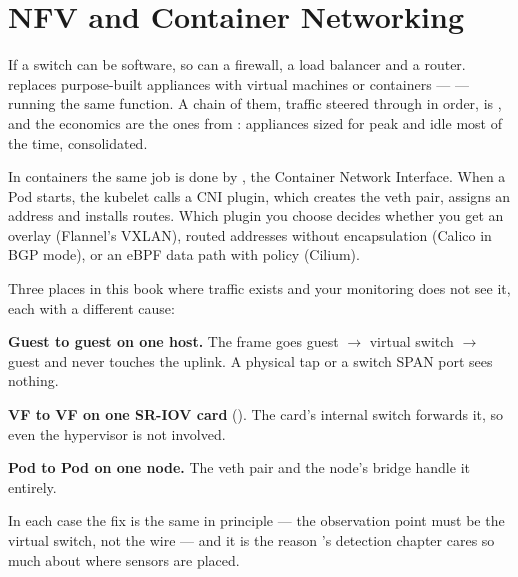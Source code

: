 \section{NFV and Container Networking}

If a switch can be software, so can a firewall, a load balancer and a router.
 replaces purpose-built appliances with
virtual machines or containers ---  --- running the same function.
A chain of them, traffic steered through in order, is ,
and the economics are the ones from : appliances sized for peak and
idle most of the time, consolidated.

In containers the same job is done by , the Container Network
Interface. When a Pod starts, the kubelet calls a CNI plugin, which creates the
veth pair, assigns an address and installs routes. Which plugin you choose
decides whether you get an overlay (Flannel's VXLAN), routed addresses without
encapsulation (Calico in BGP mode), or an eBPF data path with policy (Cilium).

\begin{alertbox}
Three places in this book where traffic exists and your monitoring does not see
it, each with a different cause:

\smallskip
\textbf{Guest to guest on one host.} The frame goes guest $\rightarrow$ virtual
switch $\rightarrow$ guest and never touches the uplink. A physical tap or a
switch SPAN port sees nothing.

\smallskip
\textbf{VF to VF on one SR-IOV card} (). The card's internal
switch forwards it, so even the hypervisor is not involved.

\smallskip
\textbf{Pod to Pod on one node.} The veth pair and the node's bridge handle it
entirely.

\smallskip
In each case the fix is the same in principle --- the observation point must be
the virtual switch, not the wire --- and it is the reason
's detection chapter cares so much about where sensors are
placed.
\end{alertbox}

